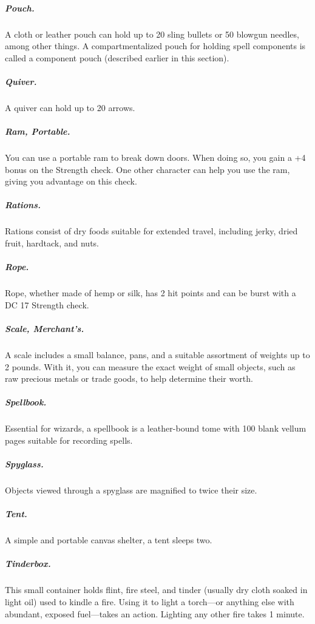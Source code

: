 \subparagraph*{Pouch.} A cloth or leather pouch can hold up to 20 sling bullets or 50 blowgun needles, among other things. A compartmentalized pouch for holding spell components is called a component pouch (described earlier in this section). 

\subparagraph*{Quiver.} A quiver can hold up to 20 arrows.

\subparagraph*{Ram, Portable.} You can use a portable ram to break down doors. When doing so, you gain a +4 bonus on the Strength check. One other character can help you use the ram, giving you advantage on this check.

\subparagraph*{Rations.} Rations consist of dry foods suitable for extended travel, including jerky, dried fruit, hardtack, and nuts.

\subparagraph*{Rope.} Rope, whether made of hemp or silk, has 2 hit points and can be burst with a DC 17 Strength check.

\subparagraph*{Scale, Merchant's.} A scale includes a small balance, pans, and a suitable assortment of weights up to 2 pounds. With it, you can measure the exact weight of small objects, such as raw precious metals or trade goods, to help determine their worth.

\subparagraph*{Spellbook.} Essential for wizards, a spellbook is a leather-bound tome with 100 blank vellum pages suitable for recording spells.

\subparagraph*{Spyglass.} Objects viewed through a spyglass are magnified to twice their size.

\subparagraph*{Tent.} A simple and portable canvas shelter, a tent sleeps two.

\subparagraph*{Tinderbox.} This small container holds flint, fire steel, and tinder (usually dry cloth soaked in light oil) used to kindle a fire. Using it to light a torch—or anything else with abundant, exposed fuel—takes an action. Lighting any other fire takes 1 minute.

